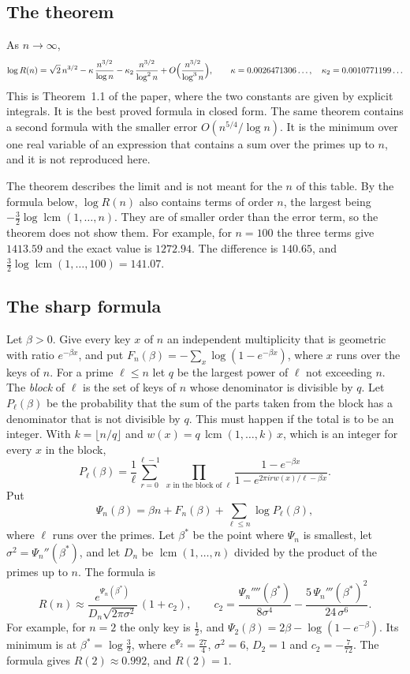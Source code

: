 \documentclass[10pt]{article}
\DeclareMathOperator{\lcm}{lcm}
\begin{document}
\subsection*{The theorem}
As $n\to\infty$,
\begin{equation}\label{thm}
 \log R(n)=\sqrt2\,n^{3/2}-\kappa\,\frac{n^{3/2}}{\log n}-\kappa_2\,\frac{n^{3/2}}{\log^2n}
 +O\Bigl(\frac{n^{3/2}}{\log^3n}\Bigr),\qquad \kappa=0.0026471306\ldots,\quad \kappa_2=0.0010771199\ldots
\end{equation}
This is Theorem~1.1 of the paper, where the two constants are given by explicit integrals. It is the best proved
formula in closed form. The same theorem contains a second formula with the smaller error
$O(n^{5/4}/\log n)$. It is the minimum over one real variable of an expression that contains a sum over the
primes up to $n$, and it is not reproduced here.

The theorem describes the limit and is not meant for the $n$ of this table. By the formula below, $\log R(n)$
also contains terms of order $n$, the largest being $-\frac32\log\lcm(1,\dots,n)$. They are of smaller order
than the error term, so the theorem does not show them. For example, for $n=100$ the three terms give
$1413.59$ and the exact value is $1272.94$. The difference is $140.65$, and
$\frac32\log\lcm(1,\dots,100)=141.07$.

\subsection*{The sharp formula}
Let $\beta>0$. Give every key $x$ of $n$ an independent multiplicity that is geometric with ratio $e^{-\beta x}$,
and put $F_n(\beta)=-\sum_x\log(1-e^{-\beta x})$, where $x$ runs over the keys of $n$.
For a prime $\ell\le n$ let $q$ be the largest power of $\ell$ not exceeding $n$. The \emph{block} of $\ell$ is
the set of keys of $n$ whose denominator is divisible by $q$. Let $P_\ell(\beta)$ be the probability that the sum
of the parts taken from the block has a denominator that is not divisible by $q$. This must happen if the total
is to be an integer. With $k=\lfloor n/q\rfloor$ and $w(x)=q\,\lcm(1,\dots,k)\,x$, which is an integer for every
$x$ in the block,
\[
 P_\ell(\beta)=\frac1\ell\sum_{r=0}^{\ell-1}\ \prod_{x\text{ in the block of }\ell}
 \frac{1-e^{-\beta x}}{1-e^{2\pi irw(x)/\ell-\beta x}} .
\]
Put
\[
 \Psi_n(\beta)=\beta n+F_n(\beta)+\sum_{\ell\le n}\log P_\ell(\beta),
\]
where $\ell$ runs over the primes. Let $\beta^*$ be the point where $\Psi_n$ is smallest, let
$\sigma^2=\Psi_n''(\beta^*)$, and let $D_n$ be $\lcm(1,\dots,n)$ divided by the product of the primes up to $n$.
The formula is
\begin{equation}\label{sharp}
 R(n)\approx\frac{e^{\Psi_n(\beta^*)}}{D_n\sqrt{2\pi\sigma^2}}\,(1+c_2),\qquad
 c_2=\frac{\Psi_n''''(\beta^*)}{8\sigma^4}-\frac{5\,\Psi_n'''(\beta^*)^2}{24\,\sigma^6}.
\end{equation}
For example, for $n=2$ the only key is $\frac12$, and $\Psi_2(\beta)=2\beta-\log(1-e^{-\beta})$. Its minimum is
at $\beta^*=\log\frac32$, where $e^{\Psi_2}=\frac{27}4$, $\sigma^2=6$, $D_2=1$ and $c_2=-\frac7{72}$. The formula
gives $R(2)\approx0.992$, and $R(2)=1$.
\end{document}
